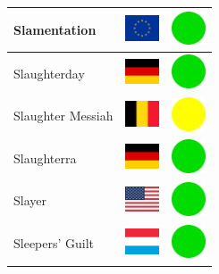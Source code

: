 \documentclass[12pt, a4paper, twoside]{report}
\begin{document}
\begin{center}
\begin{longtable}{|p{5cm}|p{2cm}|p{2cm}|}
 Slamentation                                               & \includegraphics[width=1cm]{../img/flags/eu} &   \includegraphics[width=1cm]{../likes/y} \\ \hline
 Slaughterday                                               & \includegraphics[width=1cm]{../img/flags/de} &   \includegraphics[width=1cm]{../likes/y} \\ \hline
 Slaughter Messiah                                          & \includegraphics[width=1cm]{../img/flags/be} &   \includegraphics[width=1cm]{../likes/m} \\ \hline
 Slaughterra                                                & \includegraphics[width=1cm]{../img/flags/de} &   \includegraphics[width=1cm]{../likes/y} \\ \hline
 Slayer                                                     & \includegraphics[width=1cm]{../img/flags/us} &   \includegraphics[width=1cm]{../likes/y} \\ \hline
 Sleepers' Guilt                                            & \includegraphics[width=1cm]{../img/flags/lu} &   \includegraphics[width=1cm]{../likes/y} \\ \hline

\end{longtable}
\end{center}
\end{document}
